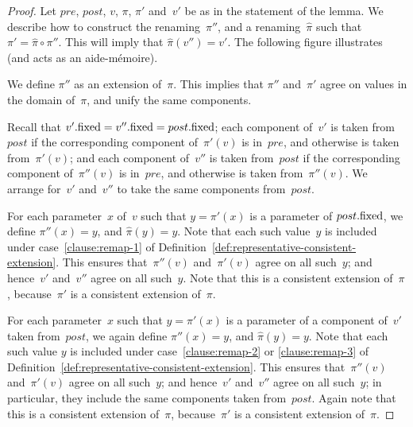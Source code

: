 \begin{proof}
Let $pre$, $post$, $v$, $\pi$, $\pi'$ and~$v'$ be as in the statement of the
lemma.  We describe how to construct the renaming~$\pi''$, and a
renaming~$\hat\pi$ such that $\pi' = \hat\pi \circ \pi''$.  This will imply
that $\hat\pi(v'') = v'$.  The following figure illustrates (and acts as an
aide-m\'emoire).
%
\begin{center}
\end{center}

We define $\pi''$ as an extension of~$\pi$.  This implies that $\pi''$
and~$\pi'$ agree on values in the domain of~$\pi$, and unify the same
components.

Recall that $v'.\mathrm{fixed} = v''.\mathrm{fixed} = post.\mathrm{fixed}$; each component of~$v'$ is
taken from~$post$ if the corresponding component of~$\pi'(v)$ is in~$pre$, and
otherwise is taken from~$\pi'(v)$; and each component of~$v''$ is taken
from~$post$ if the corresponding component of~$\pi''(v)$ is in~$pre$, and
otherwise is taken from~$\pi''(v)$.  We arrange for~$v'$ and~$v''$ to take the
same components from~$post$.


For each parameter~$x$ of~$v$ such that $y = \pi'(x)$ is a parameter of
$post.\mathrm{fixed}$, we define $\pi''(x) = y$, and $\hat\pi(y) = y$.  Note that each
such value~$y$ is included under case~\ref{clause:remap-1} of
Definition~\ref{def:representative-consistent-extension}.  This ensures
that~$\pi''(v)$ and~$\pi'(v)$ agree on all such~$y$; and hence~$v'$ and~$v''$
agree on all such~$y$.  Note that this is a consistent extension of~$\pi$,
because~$\pi'$ is a consistent extension of~$\pi$.  

For each parameter~$x$ such that $y = \pi'(x)$ is a parameter of a component
of~$v'$ taken from~$post$, we again define $\pi''(x) = y$, and $\hat\pi(y) =
y$.  Note that each such value $y$ is included under
case~\ref{clause:remap-2} or \ref{clause:remap-3} of
Definition~\ref{def:representative-consistent-extension}.  This ensures
that~$\pi''(v)$ and~$\pi'(v)$ agree on all such~$y$; and hence~$v'$ and~$v''$
agree on all such~$y$; in particular, they include the same components taken
from~$post$.  Again note that this is a consistent extension of~$\pi$,
because~$\pi'$ is a consistent extension of~$\pi$. 


\end{proof}
